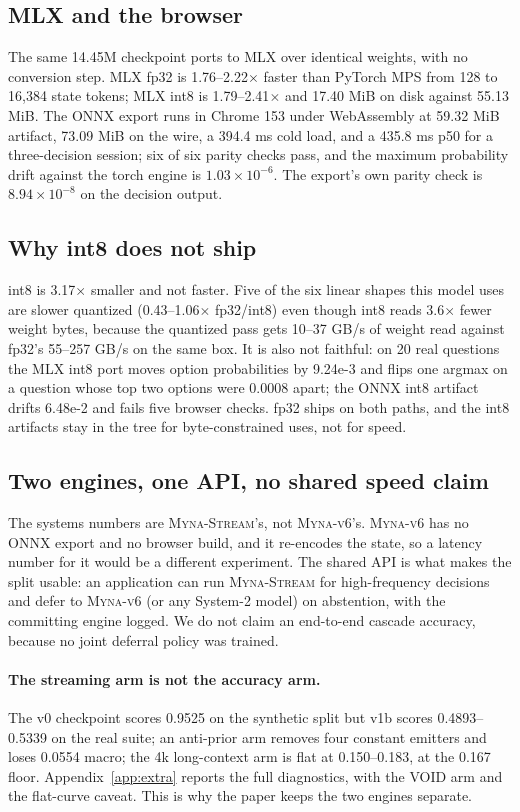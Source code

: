 \documentclass[11pt]{article}
\newcommand{\stream}{\textsc{Myna-Stream}}
\newcommand{\vsix}{\textsc{Myna-v6}}
\begin{document}
\subsection{MLX and the browser}
The same 14.45M checkpoint ports to MLX over identical weights, with no conversion step. MLX fp32 is 1.76--2.22$\times$ faster than PyTorch MPS from 128 to 16{,}384 state tokens; MLX int8 is 1.79--2.41$\times$ and 17.40 MiB on disk against 55.13 MiB. The ONNX export runs in Chrome 153 under WebAssembly at 59.32 MiB artifact, 73.09 MiB on the wire, a 394.4 ms cold load, and a 435.8 ms p50 for a three-decision session; six of six parity checks pass, and the maximum probability drift against the torch engine is $1.03\times10^{-6}$. The export's own parity check is $8.94\times10^{-8}$ on the decision output.

\subsection{Why int8 does not ship}
int8 is 3.17$\times$ smaller and not faster. Five of the six linear shapes this model uses are slower quantized (0.43--1.06$\times$ fp32/int8) even though int8 reads 3.6$\times$ fewer weight bytes, because the quantized pass gets 10--37 GB/s of weight read against fp32's 55--257 GB/s on the same box. It is also not faithful: on 20 real questions the MLX int8 port moves option probabilities by 9.24e-3 and flips one argmax on a question whose top two options were 0.0008 apart; the ONNX int8 artifact drifts 6.48e-2 and fails five browser checks. fp32 ships on both paths, and the int8 artifacts stay in the tree for byte-constrained uses, not for speed.

\subsection{Two engines, one API, no shared speed claim}
The systems numbers are \stream{}'s, not \vsix{}'s. \vsix{} has no ONNX export and no browser build, and it re-encodes the state, so a latency number for it would be a different experiment. The shared API is what makes the split usable: an application can run \stream{} for high-frequency decisions and defer to \vsix{} (or any System-2 model) on abstention, with the committing engine logged. We do not claim an end-to-end cascade accuracy, because no joint deferral policy was trained.

\paragraph{The streaming arm is not the accuracy arm.}
The v0 checkpoint scores 0.9525 on the synthetic split but v1b scores 0.4893--0.5339 on the real suite; an anti-prior arm removes four constant emitters and loses 0.0554 macro; the 4k long-context arm is flat at 0.150--0.183, at the 0.167 floor. Appendix~\ref{app:extra} reports the full diagnostics, with the VOID arm and the flat-curve caveat. This is why the paper keeps the two engines separate.
\end{document}
